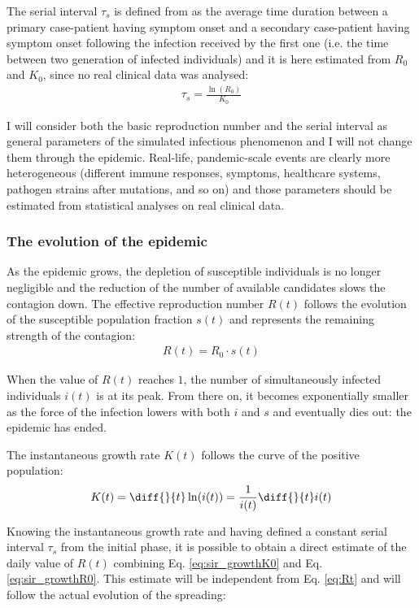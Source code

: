 \documentclass[DIV=12, BCOR=0pt]{scrartcl}  %
\begin{document}
	The serial interval $\tau_s$ is defined from \citet{Du2020} as the average time duration between a primary case-patient having symptom onset and a secondary case-patient having symptom onset following the infection received by the first one (i.e. the time between two generation of infected individuals) and it is here estimated from $R_0$ and $K_0$, since no real clinical data was analysed: 
	\begin{align}
		\tau_s = \frac{\ln(R_0)}{K_0}
		\label{eq:serial}
	\end{align}

	I will consider both the basic reproduction number and the serial interval as general parameters of the simulated infectious phenomenon and I will not change them through the epidemic. Real-life, pandemic-scale events are clearly more heterogeneous (different immune responses, symptoms, healthcare systems, pathogen strains after mutations, and so on) and those parameters should be estimated from statistical analyses on real clinical data.  

  \subsubsection{The evolution of the epidemic}
  As the epidemic grows, the depletion of susceptible individuals is no longer negligible and the reduction of the number of available candidates slows the contagion down.
  The effective reproduction number $R(t)$ follows the evolution of the susceptible population fraction $s(t)$ and represents the remaining strength of the contagion:
  \begin{align}
		R(t) = R_0 \cdot s(t) 
		\label{eq:Rt}
  \end{align}

  When the value of $R(t)$ reaches $1$, the number of simultaneously infected individuals $i(t)$ is at its peak. From there on, it becomes exponentially smaller as the force of the infection lowers with both $i$ and $s$ and eventually dies out: the epidemic has ended.
  
  The instantaneous growth rate $K(t)$ follows the curve of the positive population:
  \begin{align}
  	K(t) =  \diff{}{t} \ln(i(t)) = \frac{1}{i(t)} \diff{}{t} i(t)
  	\label{eq:Kt}
  \end{align}

	Knowing the instantaneous growth rate and having defined a constant serial interval $\tau_s$ from the initial phase, it is possible to obtain a direct estimate of the daily value of $R(t)$ combining Eq. \ref{eq:sir_growthK0} and Eq. \ref{eq:sir_growthR0}. This estimate will be independent from Eq. \ref{eq:Rt} and will follow the actual evolution of the spreading:
\end{document}
